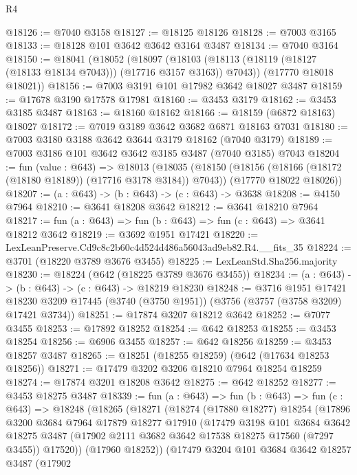 \begin{lexlean}{R4}
\begin{coremodule}
@18126 := @7040 @3158
@18127 := @18125 @18126
@18128 := @7003 @3165
@18133 := @18128 @101 @3642 @3642 @3164 @3487
@18134 := @7040 @3164
@18150 := @18041
    (@18052
      (@18097 (@18103 (@18113 (@18119 (@18127 (@18133 @18134 @7043))) (@17716 @3157 @3163)) @7043))
      (@17770 @18018 @18021))
@18156 := @7003 @3191 @101 @17982 @3642 @18027 @3487
@18159 := @17678 @3190 @17578 @17981
@18160 := @3453 @3179
@18162 := @3453 @3185 @3487
@18163 := @18160 @18162
@18166 := @18159 (@6872 @18163) @18027
@18172 := @7019 @3189 @3642 @3682 @6871 @18163 @7031
@18180 := @7003 @3180 @3188 @3642 @3644 @3179 @18162 (@7040 @3179)
@18189 := @7003 @3186 @101 @3642 @3642 @3185 @3487 (@7040 @3185) @7043
@18204 := fun (value : @643) =>
  @18013
    (@18035
      (@18150 (@18156 (@18166 (@18172 (@18180 @18189)) (@17716 @3178 @3184)) @7043))
      (@17770 @18022 @18026))
@18207 := (a : @643) -> (b : @643) -> (c : @643) -> @3638
@18208 := @4150 @7964
@18210 := @3641 @18208 @3642
@18212 := @3641 @18210 @7964
@18217 := fun (a : @643) => fun (b : @643) => fun (c : @643) => @3641 @18212 @3642
@18219 := @3692 @1951 @17421
@18220 := LexLeanPreserve.Cd9c8c2b60c4d524d486a56043ad9eb82.R4.__fits_35
@18224 := @3701 (@18220 @3789 @3676 @3455)
@18225 := LexLeanStd.Sha256.majority
@18230 := @18224 (@642 (@18225 @3789 @3676 @3455))
@18234 := (a : @643) -> (b : @643) -> (c : @643) -> @18219 @18230
@18248 := @3716
    @1951
    @17421
    @18230
    @3209
    @17445
    (@3740 (@3750 @1951))
    (@3756 (@3757 (@3758 @3209) @17421 @3734))
@18251 := @17874 @3207 @18212 @3642
@18252 := @7077 @3455
@18253 := @17892 @18252
@18254 := @642 @18253
@18255 := @3453 @18254
@18256 := @6906 @3455
@18257 := @642 @18256
@18259 := @3453 @18257 @3487
@18265 := @18251 (@18255 @18259) (@642 (@17634 @18253 @18256))
@18271 := @17479 @3202 @3206 @18210 @7964 @18254 @18259
@18274 := @17874 @3201 @18208 @3642
@18275 := @642 @18252
@18277 := @3453 @18275 @3487
@18339 := fun (a : @643) =>
  fun (b : @643) =>
  fun (c : @643) =>
  @18248
    (@18265
      (@18271
        (@18274
          (@17880 @18277)
          @18254
          (@17896
            @3200
            @3684
            @7964
            @17879
            @18277
            @17910
            (@17479
              @3198
              @101
              @3684
              @3642
              @18275
              @3487
              (@17902 @2111 @3682 @3642 @17538 @18275 @17560 (@7297 @3455))
              @17520))
          (@17960 @18252))
        (@17479
          @3204
          @101
          @3684
          @3642
          @18257
          @3487
          (@17902

\end{coremodule}
\end{lexlean}
